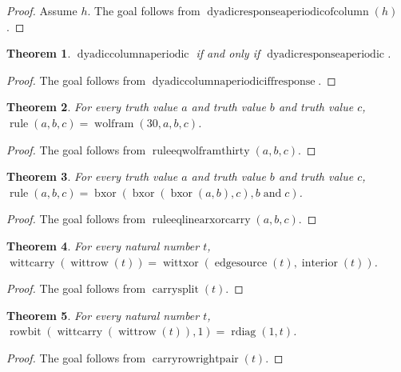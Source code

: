 \documentclass[11pt]{article}
\newtheorem{theorem}{Theorem}[section]
\theoremstyle{definition}
\begin{document}
\begin{proof}
Assume \(h\).
The goal follows from \(\operatorname{dyadicresponseaperiodicofcolumn}(h)\).
\end{proof}
\begin{theorem}
\label{ll:observations:dyadic-column-aperiodic-iff-response}
\(\operatorname{dyadiccolumnaperiodic}\) if and only if \(\operatorname{dyadicresponseaperiodic}\).
\end{theorem}
\begin{proof}
The goal follows from \(\operatorname{dyadiccolumnaperiodiciffresponse}\).
\end{proof}
\begin{theorem}
\label{ll:observations:rule-eq-wolfram-thirty}
For every truth value \(a\) and truth value \(b\) and truth value \(c\), \(\operatorname{rule}(a, b, c) = \operatorname{wolfram}(30, a, b, c)\).
\end{theorem}
\begin{proof}
The goal follows from \(\operatorname{ruleeqwolframthirty}(a, b, c)\).
\end{proof}
\begin{theorem}
\label{ll:observations:rule-eq-linear-xor-carry}
For every truth value \(a\) and truth value \(b\) and truth value \(c\), \(\operatorname{rule}(a, b, c) = \operatorname{bxor}(\operatorname{bxor}(\operatorname{bxor}(a, b), c), b \operatorname{and} c)\).
\end{theorem}
\begin{proof}
The goal follows from \(\operatorname{ruleeqlinearxorcarry}(a, b, c)\).
\end{proof}
\begin{theorem}
\label{ll:observations:carry-split}
For every natural number \(t\), \(\operatorname{wittcarry}(\operatorname{wittrow}(t)) = \operatorname{wittxor}(\operatorname{edgesource}(t), \operatorname{interior}(t))\).
\end{theorem}
\begin{proof}
The goal follows from \(\operatorname{carrysplit}(t)\).
\end{proof}
\begin{theorem}
\label{ll:observations:carry-row-right-pair}
For every natural number \(t\), \(\operatorname{rowbit}(\operatorname{wittcarry}(\operatorname{wittrow}(t)), 1) = \operatorname{rdiag}(1, t)\).
\end{theorem}
\begin{proof}
The goal follows from \(\operatorname{carryrowrightpair}(t)\).
\end{proof}
\end{document}
